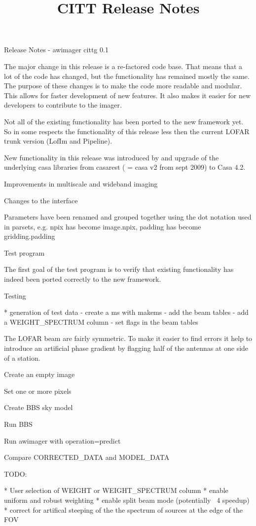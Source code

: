 \documentclass[a4paper]{article}
\title{CITT Release Notes}
\begin{document}
\maketitle

Release Notes - awimager cittg 0.1

The major change in this release is a re-factored code base.
That means that a lot of the code has changed, but the functionality has remained mostly the same.
The purpose of these changes is to make the code more readable and modular. This allows for faster development
of new features. It also makes it easier for new developers to contribute to the imager.

Not all of the existing functionality has been ported to the new framework yet. So in some respects the functionality of
this release less then the current LOFAR trunk version (LofIm and Pipeline).

New functionality in this release was introduced by and upgrade of the underlying casa libraries
from casarest ( = casa v2 from sept 2009) to Casa 4.2.

Improvements in multiscale and wideband imaging


Changes to the interface

Parameters have been renamed and grouped together using the dot notation used in parsets, e.g. 
npix has become image.npix, padding has become gridding.padding


Test program

The first goal of the test program is to verify that existing functionality has indeed been ported correctly to
the new framework.

Testing

* generation of test data
  - create a ms with makems
  - add the beam tables
  - add a WEIGHT\_SPECTRUM column
  - set flags in the beam tables 

The LOFAR beam are fairly symmetric. To make it easier to find errors it help to introduce an artificial phase
gradient by flagging half of the antennas at one side of a station.

Create an empty image

Set one or more pixels

Create BBS sky model

Run BBS

Run awimager with operation=predict

Compare CORRECTED\_DATA and MODEL\_DATA


TODO:

* User selection of WEIGHT or WEIGHT\_SPECTRUM column
* enable uniform and robust weighting
* enable split beam mode (potentially ~4 speedup)
* correct for artifical steeping of the the spectrum of sources at the edge of the FOV
\end{document}
